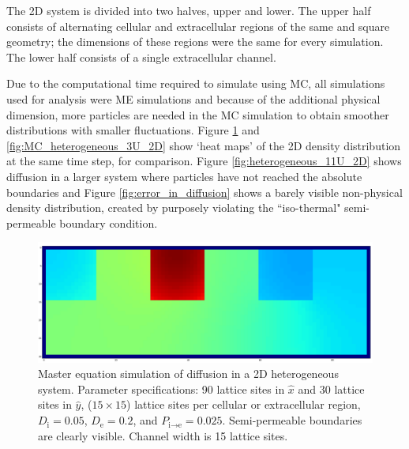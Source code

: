 	The 2D system is divided into two halves, upper and lower. The upper half consists of alternating cellular and extracellular regions of the same and square geometry; the dimensions of these regions were the same for every simulation. The lower half consists of a single extracellular channel.
	
	Due to the computational time required to simulate using MC, all simulations used for analysis were ME simulations and because of the additional physical dimension, more particles are needed in the MC simulation to obtain smoother distributions with smaller fluctuations. Figure \ref{fig:heterogeneous_3U_2D} and \ref{fig:MC_heterogeneous_3U_2D} show `heat maps' of the 2D density distribution at the same time step, for comparison. Figure \ref{fig:heterogeneous_11U_2D} shows diffusion in a larger system where particles have not reached the absolute boundaries and Figure \ref{fig:error_in_diffusion} shows a barely visible non-physical density distribution, created by purposely violating the ``iso-thermal" semi-permeable boundary condition.
	
	\begin{figure}[h]
		\centering
		\includegraphics[width=1.0\linewidth]{../images/2D/heterogeneous_3U_2D}
		\caption[2D: Master equation solution for a heterogeneous system]{Master equation simulation of diffusion in a 2D heterogeneous system. Parameter specifications: 90 lattice sites in $ \hat{x} $ and 30 lattice sites in $ \hat{y} $, ($ 15 \times 15 $) lattice sites per cellular or extracellular region, $ D_\textrm{i} = 0.05 $, $ D_\textrm{e} = 0.2 $, and $ P_{\textrm{i}\rightarrow \textrm{e}} = 0.025 $. Semi-permeable boundaries are clearly visible. Channel width is 15 lattice sites.}
		\label{fig:heterogeneous_3U_2D}
	\end{figure}
	
